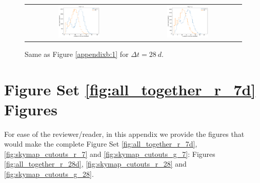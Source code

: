 \documentclass[preprintm,linenumbers]{aastex631}
\begin{document}
\begin{figure}
\begin{tabular}{c c}
				 \includegraphics[width=0.4\textwidth]{results/histograms/hist_first_year_one_snap_v4_0_10yrs_db_noDD_noTwi_CountMetric_doAllTemplateMetrics_reduceCount_z_28_noDD_noTwi.pdf} &
				\includegraphics[width=0.4\textwidth]{results/histograms/hist_first_year_one_snap_v4_0_10yrs_db_noDD_noTwi_CountMetric_doAllTemplateMetrics_reduceCount_y_28_noDD_noTwi.pdf} \\
    			
			\end{tabular}
			\caption{ Same as Figure \ref{appendixb:1} for $\Delta t = 28\ \si{d}$. \label{appendixb:4}}
		\end{figure}

  \section{Figure Set \ref{fig:all_together_r_7d} Figures}

    For ease of the reviewer/reader, in this appendix we provide the figures that would make the complete Figure Set \ref{fig:all_together_r_7d}, \ref{fig:skymap_cutouts_r_7} and \ref{fig:skymap_cutouts_g_7}: Figures \ref{fig:all_together_r_28d}, \ref{fig:skymap_cutouts_r_28} and \ref{fig:skymap_cutouts_g_28}.
    
\end{document}

